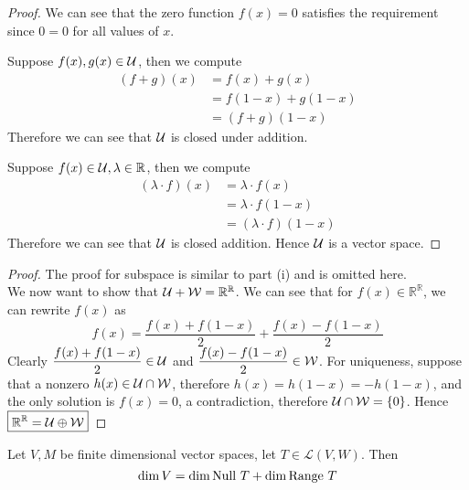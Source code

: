 \begin{proof}
            We can see that the zero function $f(x) = 0$ satisfies the requirement since $0 = 0$ for all  values of $x$. 
            
            Suppose $f(x), g(x) \in \mathcal U$, then we compute \begin{align*}
                (f + g)(x) &= f(x) + g(x) \\
                           &= f(1 - x) + g(1 - x) \\
                           &= (f + g)(1 - x)
            \end{align*}
            Therefore we can see that $\mathcal U$ is closed under addition.
            
            Suppose $f(x) \in \mathcal U, \lambda \in \mathbb R$, then we compute \begin{align*}
                (\lambda \cdot f)(x) &= \lambda \cdot f(x) \\
                                     &= \lambda \cdot f(1 - x) \\
                                     &= (\lambda \cdot f)(1 - x)
            \end{align*}
            Therefore we can see that $\mathcal U$ is closed addition. 
            Hence $\mathcal U$ is a vector space.
        \end{proof}
\begin{proof}
            The proof for subspace is similar to part (i) and is omitted here. \\
            We now want to show that $\mathcal U + \mathcal W  = \mathbb{R}^{\mathbb{R}}$. We can see that for $f(x) \in \mathbb{R}^{\mathbb{R}}$, we can rewrite $f(x)$ as
            \[ f(x) = \frac{f(x) + f(1 - x)}{2} + \frac{f(x) - f(1 - x)}{2}\]
            Clearly $\displaystyle \frac{f(x) + f(1 -x)}{2} \in \mathcal U$ and $\displaystyle \frac{f(x) - f(1 - x)}{2} \in \mathcal W$. For uniqueness, suppose that a nonzero $h(x) \in \mathcal U \cap \mathcal W$, therefore $h(x) = h(1 - x) = -h(1 - x)$, and the only solution is $f(x) = 0$, a contradiction, therefore $\mathcal U \cap \mathcal W = \left\{ 0 \right\}$. Hence $\boxed{{\mathbb R^{\mathbb{R}}} = \mathcal U \oplus \mathcal W}$
        \end{proof}
\begin{theorem}
    Let $V,M$ be finite dimensional vector spaces, let $T \in \mathcal L(V,W)$. Then
    \[ \dim V = \dim \text{Null } T + \dim \text{Range } T\]
\end{theorem}
